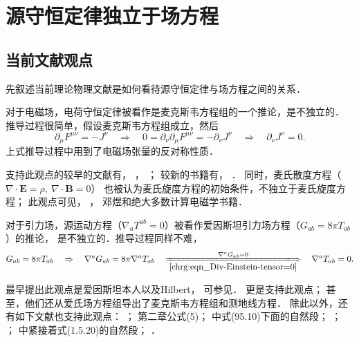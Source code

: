 

\chapter{源守恒定律独立于场方程}\label{chfd-liu}



\section{当前文献观点}
先叙述当前理论物理文献是如何看待源守恒定律与场方程之间的关系．

对于电磁场，电荷守恒定律被看作是麦克斯韦方程组的一个推论，是不独立的．
推导过程很简单，假设麦克斯韦方程组成立，然后
\begin{equation}
	\partial_\mu F^{\mu\nu} = -J^\nu \quad \Rightarrow \quad
	0=\partial_\nu\partial_\mu F^{\mu\nu} = -\partial_\nu J^\nu
	\quad \Rightarrow \quad \partial_\nu J^\nu =0.
\end{equation}
上式推导过程中用到了电磁场张量的反对称性质．

支持此观点的较早的文献有\textcite[\S 30]{landau_2-classical-fields}，
\textcite[\S 18.1-18.3]{feynman-2006-v2}，
\textcite[\S 24]{pauli-1973-ED}；
较新的书籍有\textcite[p.3]{jackson1998}，
\textcite[\S 8.1]{griffiths-2023}．
同时，麦氏散度方程（$\nabla\cdot \boldsymbol{E}=\rho,\ \nabla \cdot \boldsymbol{B}=0$）
也被认为麦氏旋度方程的初始条件，不独立于麦氏旋度方程；
此观点可见\textcite[p.6]{stratton1941}，
\textcite[p.603]{courant_hilbert-v2}，
邓煜\cite{deng-2017}和绝大多数计算电磁学书籍．




对于引力场，源运动方程（$\nabla_a T^{ab}=0$）被看作爱因斯坦引力场方程（$G_{ab}=8\pi T_{ab}$）的推论，
是不独立的．推导过程同样不难，
\begin{equation}
	G_{ab}=8\pi T_{ab} \quad \Rightarrow \quad
	\nabla^a G_{ab}=8\pi \nabla^a T_{ab}
	\quad \xLongrightarrow[\ref{chrg:eqn_Div-Einstein-tensor=0}]{\nabla^a G_{ab}=0} \quad
	\nabla^a T_{ab}=0 .
\end{equation}

最早提出此观点是爱因斯坦\cite{einstein_infeld_1949}本人以及Hilbert，
可参见\parencite[\S 15(c)]{Pais-1982}．
\textcite[\S 17.1-17.2]{mtw1973}更是支持此观点；
甚至，他们\cite[\S 20.6]{mtw1973}还从爱氏场方程组导出了麦克斯韦方程组和测地线方程．
除此以外，还有如下文献也支持此观点：
\textcite[p.44]{Choquet-Bruhat-2009}；
\textcite{hawking-1966}第二章公式(5)；
\textcite[\S 95]{landau_2-classical-fields}中式(95.10)下面的自然段；
\textcite[\S 5.4]{poisson-will-2014}；
\textcite[\S 6.6]{schutz-2022}；
\textcite[\S 1.5]{weinberg_cos-2008}中紧接着式(1.5.20)的自然段；
\textcite[\S 9.3]{witten-2024}．

